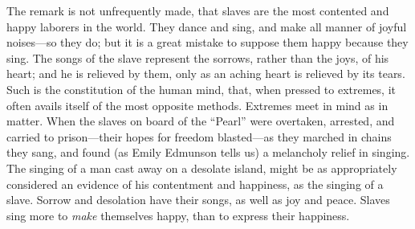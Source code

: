 The remark is not unfrequently made, that slaves are the most contented
and happy laborers in the world. They dance and sing, and make all
manner of joyful noises---so they do; but it is a great mistake to
suppose them happy because they sing. The songs of the slave represent
the sorrows, rather than the joys, of his heart; and he is relieved by
them, only as an aching heart is relieved by its tears. Such is the
constitution of the human mind, that, when pressed {}to extremes, it
often avails itself of the most opposite methods. Extremes meet in mind
as in matter. When the slaves on board of the ``Pearl'' were overtaken,
arrested, and carried to prison---their hopes for freedom blasted---as
they marched in chains they sang, and found (as Emily Edmunson tells us)
a melancholy relief in singing. The singing of a man cast away on a
desolate island, might be as appropriately considered an evidence of his
contentment and happiness, as the singing of a slave. Sorrow and
desolation have their songs, as well as joy and peace. Slaves sing more
to \emph{make} themselves happy, than to express their happiness.

